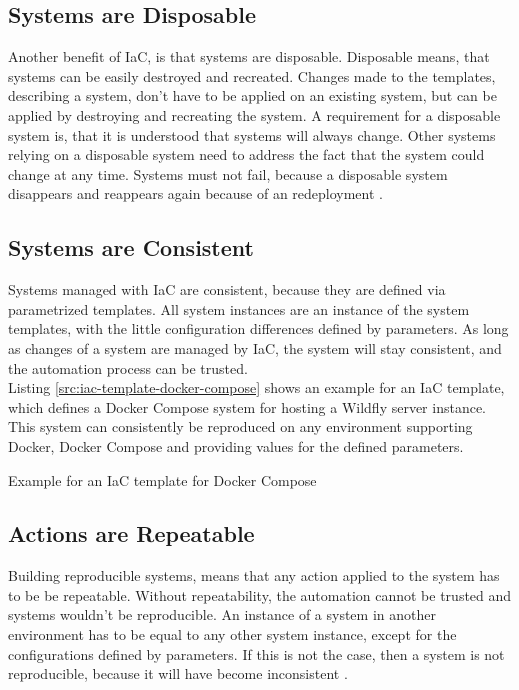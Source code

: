 \subsection{Systems are Disposable}
\label{sec:iac-principles-disposable}
Another benefit of IaC, is that systems are disposable. Disposable means, that systems can be easily destroyed and recreated. Changes made to the templates, describing a system, don't have to be applied on an existing system, but can be applied by destroying and recreating the system. A requirement for a disposable system is, that it is understood that systems will always change. Other systems relying on a disposable system need to address the fact that the system could change at any time. Systems must not fail, because a disposable system disappears and reappears again because of an redeployment \cite{Morris2016}.

\subsection{Systems are Consistent}
\label{sec:iac-principles-consistency}
Systems managed with IaC are consistent, because they are defined via parametrized templates. All system instances are an instance of the system templates, with the little configuration differences defined by parameters. As long as changes of a system are managed by IaC, the system will stay consistent, and the automation process can be trusted. \\

Listing \vref{src:iac-template-docker-compose} shows an example for an IaC template, which defines a Docker Compose system for hosting a Wildfly server instance. This system can consistently be reproduced on any environment supporting Docker, Docker Compose and providing values for the defined parameters\cite{Wildfly2017, DockerCompose2018}. \\

\begin{code}
	\caption{Example for an IaC template for Docker Compose}
	\label{src:iac-template-docker-compose}
\end{code}

\subsection{Actions are Repeatable}
\label{sec:iac-principles-repeatability}
Building reproducible systems, means that any action applied to the system has to be be repeatable. Without repeatability, the automation cannot be trusted and systems wouldn't be reproducible. An instance of a system in another environment has to be equal to any other system instance, except for the configurations defined by parameters. If this is not the case, then a system is not reproducible, because it will have become inconsistent \cite{Morris2016}. \\

